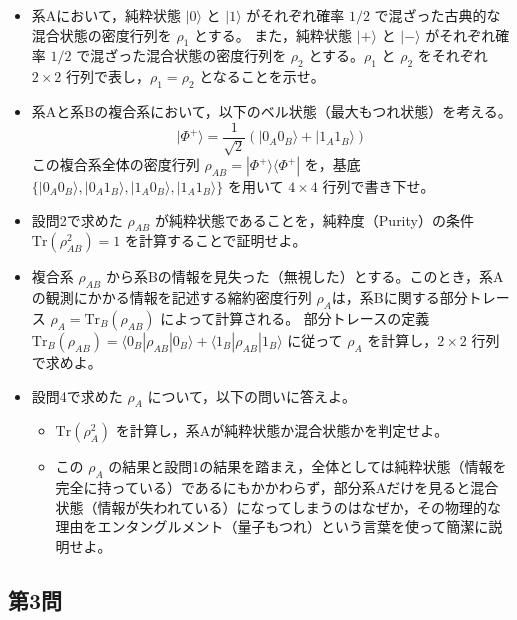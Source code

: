 \documentclass[dvipdfmx,b5paper,twoside]{jsarticle}
\begin{document}
\begin{itemize}
  \item[(1)] 系Aにおいて，純粋状態 $|0\rangle$ と $|1\rangle$ がそれぞれ確率 $1/2$ で混ざった古典的な混合状態の密度行列を $\rho_1$ とする。
また，純粋状態 $|+\rangle$ と $|-\rangle$ がそれぞれ確率 $1/2$ で混ざった混合状態の密度行列を $\rho_2$ とする。$\rho_1$ と $\rho_2$ をそれぞれ $2 \times 2$ 行列で表し，$\rho_1 = \rho_2$ となることを示せ。
  \item[(2)] 系Aと系Bの複合系において，以下のベル状態（最大もつれ状態）を考える。
  \begin{equation}
    |\Phi^+\rangle = \frac{1}{\sqrt{2}}(|0_A 0_B\rangle + |1_A 1_B\rangle)
  \end{equation}
  この複合系全体の密度行列 $\rho_{AB} = |\Phi^+\rangle\langle\Phi^+|$ を，基底 $\{|0_A 0_B\rangle, |0_A 1_B\rangle, |1_A 0_B\rangle, |1_A 1_B\rangle\}$ を用いて $4 \times 4$ 行列で書き下せ。
  \item[(3)] 設問2で求めた $\rho_{AB}$ が純粋状態であることを，純粋度（Purity）の条件 $\text{Tr}(\rho_{AB}^2) = 1$ を計算することで証明せよ。
  \item[(4)] 複合系 $\rho_{AB}$ から系Bの情報を見失った（無視した）とする。このとき，系Aの観測にかかる情報を記述する縮約密度行列 $\rho_A$は，系Bに関する部分トレース $\rho_A = \text{Tr}_B(\rho_{AB})$ によって計算される。
部分トレースの定義 $\text{Tr}_B(\rho_{AB}) = \langle 0_B | \rho_{AB} | 0_B \rangle + \langle 1_B | \rho_{AB} | 1_B \rangle$ に従って $\rho_A$ を計算し，$2 \times 2$ 行列で求めよ。
  \item[(5)] 設問4で求めた $\rho_A$ について，以下の問いに答えよ。
  \begin{itemize}
    \item[(A)] $\text{Tr}(\rho_A^2)$ を計算し，系Aが純粋状態か混合状態かを判定せよ。
    \item[(B)] この $\rho_A$ の結果と設問1の結果を踏まえ，全体としては純粋状態（情報を完全に持っている）であるにもかかわらず，部分系Aだけを見ると混合状態（情報が失われている）になってしまうのはなぜか，その物理的な理由をエンタングルメント（量子もつれ）という言葉を使って簡潔に説明せよ。
  \end{itemize}
\end{itemize}







\subsection*{第3問}
\end{document}

